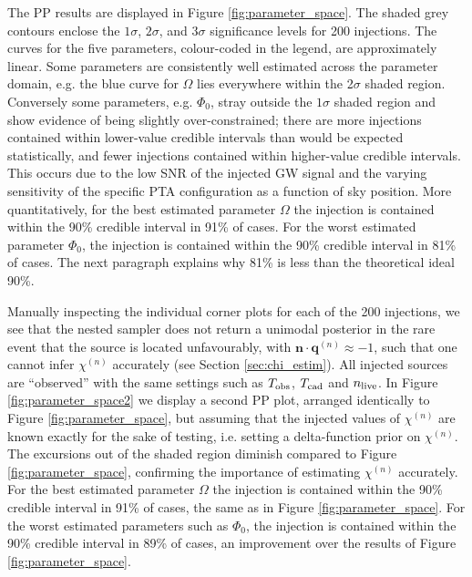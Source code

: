 \documentclass[fleqn,usenatbib,useAMS]{mnras}
\begin{document}
The PP results are displayed in Figure \ref{fig:parameter_space}. The shaded grey contours enclose the $1\sigma$, $2\sigma$, and $3\sigma$ significance levels for 200 injections. The curves for the five parameters, colour-coded in the legend, are approximately linear. Some parameters are consistently well estimated across the parameter domain, e.g. the blue curve for $\Omega$ lies everywhere within the 2$\sigma$ shaded region. Conversely some parameters, e.g. $\Phi_0$, stray outside the $1\sigma$ shaded region and show evidence of being slightly over-constrained; there are more injections contained within lower-value credible intervals than would be expected statistically, and fewer injections contained within higher-value credible intervals. This occurs due to the low SNR of the injected GW signal and the varying sensitivity of the specific PTA configuration as a function of sky position. More quantitatively, for the best estimated parameter $\Omega$ the injection is contained within the 90\% credible interval in 91\% of cases. For the worst estimated parameter $\Phi_0$, the injection is contained within the 90\% credible interval in 81\% of cases. The next paragraph explains why 81\% is less than the theoretical ideal 90\%.  \newline 

Manually inspecting the individual corner plots for each of the 200 injections, we see that the nested sampler does not return a unimodal posterior in the rare event that the source is located unfavourably, with $\boldsymbol{n} \cdot \boldsymbol{q}^{(n)} \approx -1$, such that one cannot infer $\chi^{(n)}$ accurately (see Section \ref{sec:chi_estim}). All injected sources are ``observed'' with the same settings such as $T_{\rm obs}$, $T_{\rm cad}$ and $n_{\rm live}$. In Figure \ref{fig:parameter_space2} we display a second PP plot, arranged identically to Figure \ref{fig:parameter_space}, but assuming that the injected values of $\chi^{(n)}$ are known exactly for the sake of testing, i.e. setting a delta-function prior on $\chi^{(n)}$. The excursions out of the shaded region diminish compared to Figure \ref{fig:parameter_space}, confirming the importance of estimating $\chi^{(n)}$ accurately. For the best estimated parameter $\Omega$ the injection is contained within the 90\% credible interval in 91\% of cases, the same as in Figure \ref{fig:parameter_space}. For the worst estimated parameters such as $\Phi_0$, the injection is contained within the 90\% credible interval in 89\% of cases, an improvement over the results of Figure \ref{fig:parameter_space}. \newline 
\end{document}
